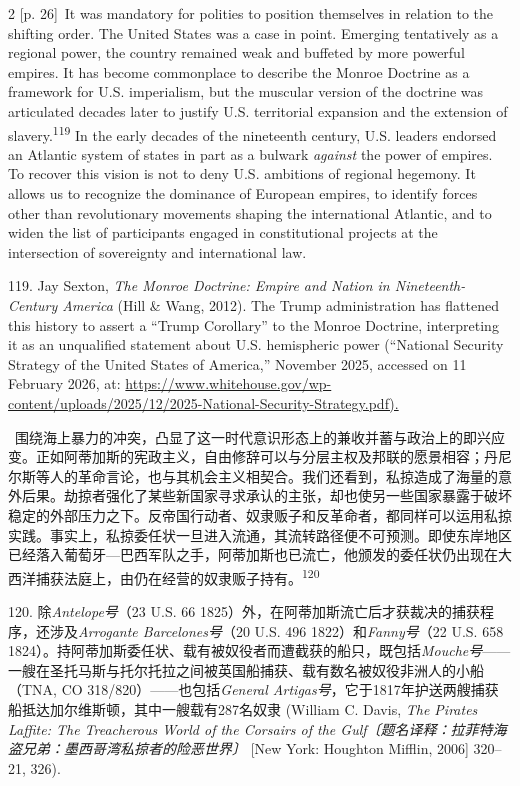 \documentclass[10pt,a4paper]{article}
\begin{document}
\begin{paracol}{2}
\switchcolumn
{\scriptsize\color{gray} [p. 26]}\ It was mandatory for polities to position themselves in relation to the shifting order. The United States was a case in point. Emerging tentatively as a regional power, the country remained weak and buffeted by more powerful empires. It has become commonplace to describe the Monroe Doctrine as a framework for U.S. imperialism, but the muscular version of the doctrine was articulated decades later to justify U.S. territorial expansion and the extension of slavery.\nobreak\textsuperscript{119} In the early decades of the nineteenth century, U.S. leaders endorsed an Atlantic system of states in part as a bulwark \textit{against} the power of empires. To recover this vision is not to deny U.S. ambitions of regional hegemony. It allows us to recognize the dominance of European empires, to identify forces other than revolutionary movements shaping the international Atlantic, and to widen the list of participants engaged in constitutional projects at the intersection of sovereignty and international law.\par{\small 119. Jay Sexton, \textit{The Monroe Doctrine: Empire and Nation in Nineteenth-Century America} (Hill \& Wang, 2012). The Trump administration has flattened this history to assert a “Trump Corollary” to the Monroe Doctrine, interpreting it as an unqualified statement about U.S. hemispheric power (“National Security Strategy of the United States of America,” November 2025, accessed on 11 February 2026, at: \url{https://www.whitehouse.gov/wp-content/uploads/2025/12/2025-National-Security-Strategy.pdf).}\par}
\switchcolumn*
{\scriptsize\color{gray} [p. 27]}\ 围绕海上暴力的冲突，凸显了这一时代意识形态上的兼收并蓄与政治上的即兴应变。正如阿蒂加斯的宪政主义，自由修辞可以与分层主权及邦联的愿景相容；丹尼尔斯等人的革命言论，也与其机会主义相契合。我们还看到，私掠造成了海量的意外后果。劫掠者强化了某些新国家寻求承认的主张，却也使另一些国家暴露于破坏稳定的外部压力之下。反帝国行动者、奴隶贩子和反革命者，都同样可以运用私掠实践。事实上，私掠委任状一旦进入流通，其流转路径便不可预测。即使东岸地区已经落入葡萄牙—巴西军队之手，阿蒂加斯也已流亡，他颁发的委任状仍出现在大西洋捕获法庭上，由仍在经营的奴隶贩子持\mbox{有。\textsuperscript{120}}\par{\small 120. 除\textit{Antelope号}（23 U.S. 66 1825）外，在阿蒂加斯流亡后才获裁决的捕获程序，还涉及\textit{Arrogante Barcelones号}（20 U.S. 496 1822）和\textit{Fanny号}（22 U.S. 658 1824）。持阿蒂加斯委任状、载有被奴役者而遭截获的船只，既包括\textit{Mouche号}——一艘在圣托马斯与托尔托拉之间被英国船捕获、载有数名被奴役非洲人的小船（TNA, CO 318/820）——也包括\textit{General Artigas号}，它于1817年护送两艘捕获船抵达加尔维斯顿，其中一艘载有287名奴隶 (William C. Davis, \textit{The Pirates Laffite: The Treacherous World of the Corsairs of the Gulf〔题名译释：拉菲特海盗兄弟：墨西哥湾私掠者的险恶世界〕} [New York: Houghton Mifflin, 2006] 320–21, 326).\par}

\end{paracol}
\end{document}
